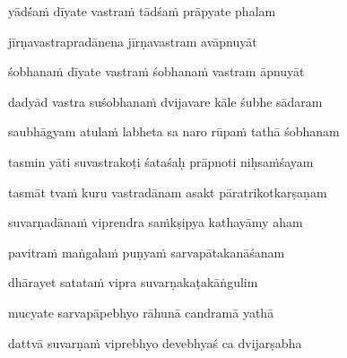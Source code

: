 yādśaṁ dīyate vastraṁ tādśaṁ prāpyate phalam\thinspace{\dandab} \dontdisplaylinenum

jīrṇavastrapradānena jīrṇavastram avāpnuyāt \danda\dontdisplaylinenum

śobhanaṁ dīyate vastraṁ śobhanaṁ vastram āpnuyāt \veg\dontdisplaylinenum

\ujvers\nemsloka 
dadyād vastra suśobhanaṁ dvijavare kāle śubhe sādaram
\dontdisplaylinenum
{}

\nemslokab 
saubhāgyam atulaṁ labheta sa naro rūpaṁ tathā śobhanam \danda\dontdisplaylinenum
{}

\nemslokac 
tasmin yāti suvastrakoṭi śataśaḥ prāpnoti niḥsaṁśayam
\dontdisplaylinenum
{}

\nemslokad 
tasmāt tvaṁ kuru vastradānam asakt pāratrikotkarṣaṇam \veg\dontdisplaylinenum
{}



\vers

suvarṇadānaṁ viprendra saṁkṣipya kathayāmy aham\thinspace{\dandab} \dontdisplaylinenum
{}

pavitraṁ maṅgalaṁ puṇyaṁ sarvapātakanāśanam \veg\dontdisplaylinenum
{}

dhārayet satataṁ vipra suvarṇakaṭakāṅgulim\thinspace{\dandab} \dontdisplaylinenum
{}

mucyate sarvapāpebhyo rāhunā candramā yathā \veg\dontdisplaylinenum

dattvā suvarṇaṁ viprebhyo devebhyaś ca dvijarṣabha\thinspace{\dandab} \dontdisplaylinenum
{}


